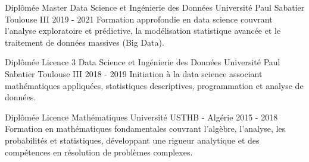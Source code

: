 


\begin{cventries}


\cventry
{Diplômée} %
{Master Data Science et Ingénierie des Données} %
{Université Paul Sabatier Toulouse III} %
{2019 - 2021} %
{Formation approfondie en data science couvrant l'analyse exploratoire et prédictive, la modélisation statistique avancée et le traitement de données massives (Big Data).} %



\cventry
{Diplômée} %
{Licence 3 Data Science et Ingénierie des Données} %
{Université Paul Sabatier Toulouse III} %
{2018 - 2019} %
{Initiation à la data science associant mathématiques appliquées, statistiques descriptives, programmation et analyse de données.} %


\cventry
{Diplômée} %
{Licence Mathématiques} %
{Université USTHB - Algérie} %
{2015 - 2018} %
{Formation en mathématiques fondamentales couvrant l'algèbre, l'analyse, les probabilités et statistiques, développant une rigueur analytique et des compétences en résolution de problèmes complexes.} %



\end{cventries}